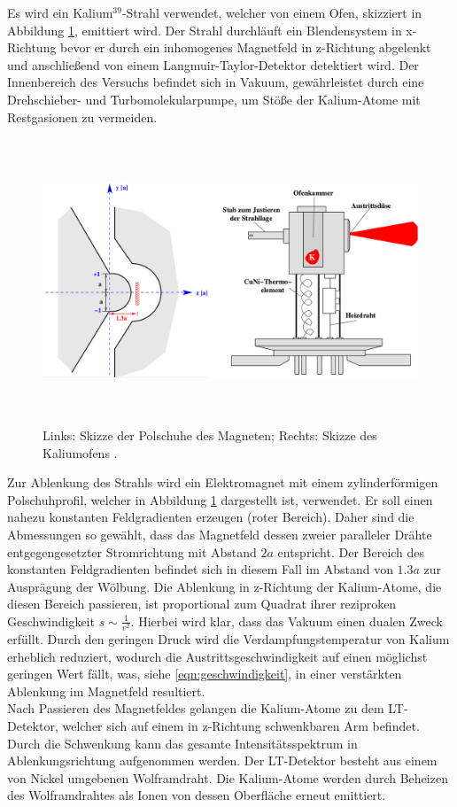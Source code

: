 Es wird ein Kalium$^{39}$-Strahl verwendet, welcher von einem Ofen, skizziert in Abbildung \ref{fig:aufbau2}, emittiert wird.
Der Strahl durchläuft ein Blendensystem in x-Richtung bevor er durch ein inhomogenes Magnetfeld in z-Richtung abgelenkt und anschließend von einem Langmuir-Taylor-Detektor detektiert wird.
Der Innenbereich des Versuchs befindet sich in Vakuum, gewährleistet durch eine Drehschieber- und Turbomolekularpumpe, um Stöße der Kalium-Atome mit Restgasionen zu vermeiden.
\begin{figure}
  \centering
  \includegraphics[height=8.5cm]{ressources/aufbau2.png}
  \caption{Links: Skizze der Polschuhe des Magneten; Rechts: Skizze des Kaliumofens \cite{skript}.}
  \label{fig:aufbau2}
\end{figure}
Zur Ablenkung des Strahls wird ein Elektromagnet mit einem zylinderförmigen Polschuhprofil, welcher in Abbildung \ref{fig:aufbau2} dargestellt ist, verwendet.
Er soll einen nahezu konstanten Feldgradienten erzeugen (roter Bereich).
Daher sind die Abmessungen so gewählt, dass das Magnetfeld dessen zweier paralleler Drähte entgegengesetzter Stromrichtung mit Abstand $2a$ entspricht.
Der Bereich des konstanten Feldgradienten befindet sich in diesem Fall im Abstand von $1.3a$ zur Ausprägung der Wölbung.
Die Ablenkung in z-Richtung der Kalium-Atome, die diesen Bereich passieren, ist proportional zum Quadrat ihrer reziproken Geschwindigkeit $s\sim \frac{1}{v^2}$.
Hierbei wird klar, dass das Vakuum einen dualen Zweck erfüllt.
Durch den geringen Druck wird die Verdampfungstemperatur von Kalium erheblich reduziert, wodurch die Austrittsgeschwindigkeit auf einen möglichst geringen Wert fällt, was, siehe \eqref{eqn:geschwindigkeit}, in einer verstärkten Ablenkung im Magnetfeld resultiert.\\
Nach Passieren des Magnetfeldes gelangen die Kalium-Atome zu dem LT-Detektor, welcher sich auf einem in z-Richtung schwenkbaren Arm befindet.
Durch die Schwenkung kann das gesamte Intensitätsspektrum in Ablenkungsrichtung aufgenommen werden.
Der LT-Detektor besteht aus einem von Nickel umgebenen Wolframdraht.
Die Kalium-Atome werden durch Beheizen des Wolframdrahtes als Ionen von dessen Oberfläche erneut emittiert.
